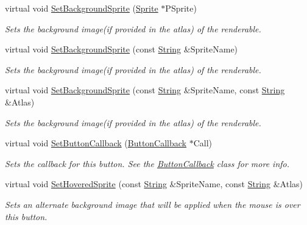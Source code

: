 \begin{DoxyCompactItemize}
virtual void \hyperlink{classMezzanine_1_1UI_1_1Button_af16ce9c5182ca4a4e52649b517499728}{SetBackgroundSprite} (\hyperlink{structMezzanine_1_1UI_1_1Sprite}{Sprite} $\ast$PSprite)
\begin{DoxyCompactList}\small\item\em Sets the background image(if provided in the atlas) of the renderable. \item\end{DoxyCompactList}\item 
virtual void \hyperlink{classMezzanine_1_1UI_1_1Button_a92731109f8888d1e82e27185d4c9d559}{SetBackgroundSprite} (const \hyperlink{namespaceMezzanine_acf9fcc130e6ebf08e3d8491aebcf1c86}{String} \&SpriteName)
\begin{DoxyCompactList}\small\item\em Sets the background image(if provided in the atlas) of the renderable. \item\end{DoxyCompactList}\item 
virtual void \hyperlink{classMezzanine_1_1UI_1_1Button_acd2b68924ad5f790afde9a32f83ca206}{SetBackgroundSprite} (const \hyperlink{namespaceMezzanine_acf9fcc130e6ebf08e3d8491aebcf1c86}{String} \&SpriteName, const \hyperlink{namespaceMezzanine_acf9fcc130e6ebf08e3d8491aebcf1c86}{String} \&Atlas)
\begin{DoxyCompactList}\small\item\em Sets the background image(if provided in the atlas) of the renderable. \item\end{DoxyCompactList}\item 
virtual void \hyperlink{classMezzanine_1_1UI_1_1Button_a0eda9fd6641f9ca52fd5e8e1c3767970}{SetButtonCallback} (\hyperlink{classMezzanine_1_1UI_1_1ButtonCallback}{ButtonCallback} $\ast$Call)
\begin{DoxyCompactList}\small\item\em Sets the callback for this button. See the \hyperlink{classMezzanine_1_1UI_1_1ButtonCallback}{ButtonCallback} class for more info. \item\end{DoxyCompactList}\item 
virtual void \hyperlink{classMezzanine_1_1UI_1_1Button_a1465419bd4ff0a60c740d02dd61d0e3f}{SetHoveredSprite} (const \hyperlink{namespaceMezzanine_acf9fcc130e6ebf08e3d8491aebcf1c86}{String} \&SpriteName, const \hyperlink{namespaceMezzanine_acf9fcc130e6ebf08e3d8491aebcf1c86}{String} \&Atlas)
\begin{DoxyCompactList}\small\item\em Sets an alternate background image that will be applied when the mouse is over this button. \item\end{DoxyCompactList}\item 

\end{DoxyCompactItemize}
